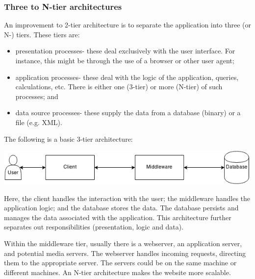 \documentclass[a4paper, openany]{memoir}
\begin{document}
\subsubsection{Three to N-tier architectures}
An improvement to 2-tier architecture is to separate the application into three (or N-) tiers. These tiers are:
\begin{itemize}
    \item presentation processes- these deal exclusively with the user interface. For instance, this might be through the use of a browser or other user agent;
    \item application processes- these deal with the logic of the application, queries, calculations, etc. There is either one (3-tier) or more (N-tier) of such processes; and
    \item data source processes- these supply the data from a database (binary) or a file (e.g. XML).
\end{itemize}
The following is a basic 3-tier architecture:
\begin{center}
    \includegraphics[scale=0.8]{src/L8I1.png}
\end{center}
Here, the client handles the interaction with the user; the middleware handles the application logic; and the database stores the data. The database persists and manages the data associated with the application. This architecture further separates out responsibilities (presentation, logic and data).

Within the middleware tier, usually there is a webserver, an application server, and potential media servers. The webserver handles incoming requests, directing them to the appropriate server. The servers could be on the same machine or different machines. An N-tier architecture makes the website more scalable.
\end{document}
